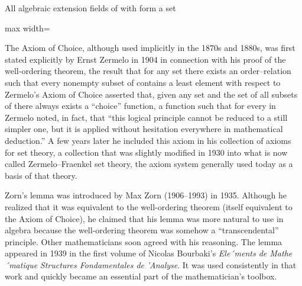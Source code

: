 \documentclass[11pt,oneside]{article}
\begin{document}
\begin{BookBody}
All algebraic extension fields  of  with  form a set

\begin{center}\begin{adjustbox}{max width=\linewidth}\end{adjustbox}\end{center}

\end{BookBody}

\BookNarrativetrue

\begin{BookBody}


\noindent The Axiom of Choice, although used implicitly in the 1870s and 1880s, was first stated explicitly by Ernst Zermelo in 1904 in connection with his proof of the well-ordering theorem, the result that for any set  there exists an order–relation \BookInline{<} such that every nonempty subset  of  contains a least element with respect to  Zermelo’s Axiom of Choice asserted that, given any set  and the set  of all subsets of  there always exists a “choice” function, a function  such that  for every  in  Zermelo noted, in fact, that “this logical principle cannot  be reduced to a still simpler one, but it is applied without hesitation everywhere in mathematical deduction.” A few years later he included this axiom in his collection of axioms for set theory, a collection that was slightly modified in 1930 into what is now called Zermelo–Fraenkel set theory, the axiom system generally used today as a basis of that theory.

Zorn’s lemma was introduced by Max Zorn (1906–1993) in 1935. Although he realized that it was equivalent to the well-ordering theorem (itself equivalent to the Axiom of Choice), he claimed that his lemma was more natural to use in algebra because the well-ordering theorem was somehow a “transcendental” principle. Other mathematicians soon agreed with his reasoning. The lemma appeared in 1939 in the first volume of Nicolas Bourbaki’s\textit{ Ele´ments de Mathe´matique} \textit{Struc}\textit{tures Fondamentales de} \textit{’Analyse}. It was used consistently in that work and quickly became an essential part of the mathematician’s toolbox.


\end{BookBody}
\end{document}
